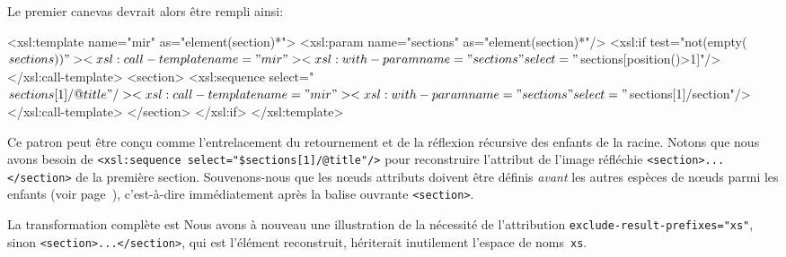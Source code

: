 Le premier canevas devrait alors être rempli ainsi:
\begin{sverb}
  <xsl:template name="mir" as="element(section)*">
    <xsl:param name="sections" as="element(section)*"/>
    <xsl:if test="not(empty($sections))">
      <xsl:call-template name="mir">
        <xsl:with-param name="sections"
                        select="$sections[position()>1]"/>
      </xsl:call-template>
      <section>
        <xsl:sequence select="$sections[1]/@title"/>
        <xsl:call-template name="mir">
          <xsl:with-param name="sections"
                          select="$sections[1]/section"/>
        </xsl:call-template>
      </section>
    </xsl:if>
  </xsl:template>
\end{sverb}
Ce patron peut être conçu comme l'entrelacement du retournement et de
la réflexion récursive des enfants de la racine. Notons que nous avons
besoin de \texttt{<xsl:sequence select="\$sections[1]/@title"/>} pour
reconstruire l'attribut de l'image réfléchie
\texttt{<section>...</section>} de la première section. Souvenons-nous
que les n{\oe}uds attributs doivent être définis \emph{avant} les
autres espèces de n{\oe}uds parmi les enfants (voir
page~\pageref{attr_before}), c'est-à-dire immédiatement après la
balise ouvrante \texttt{<section>}.

La transformation complète est
\noindent Nous avons à nouveau une illustration de la nécessité de
l'attribution \texttt{exclude-result-prefixes="xs"}, sinon
\texttt{<section>...</section>}, qui est l'élément reconstruit,
hériterait inutilement l'espace de noms~\texttt{xs}.

